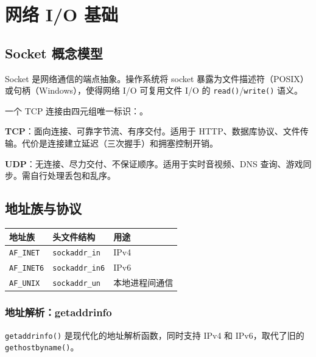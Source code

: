 \documentclass[12pt,a4paper,fontset=fandol]{ctexbook}
\newcommand{\Fn}[1]{\texttt{#1()}}
\newcommand{\Tp}[1]{\texttt{#1}}
\begin{document}
\chapter{网络 I/O 基础}

\section{Socket 概念模型}

Socket 是网络通信的端点抽象。操作系统将 socket 暴露为文件描述符（POSIX）或句柄（Windows），使得网络 I/O 可复用文件 I/O 的 \Fn{read}/\allowbreak{}\Fn{write} 语义。

一个 TCP 连接由四元组唯一标识：\texttt{}。

\begin{guideline}[title=TCP vs UDP 选型]
\textbf{TCP}：面向连接、可靠字节流、有序交付。适用于 HTTP、数据库协议、文件传输。代价是连接建立延迟（三次握手）和拥塞控制开销。

\textbf{UDP}：无连接、尽力交付、不保证顺序。适用于实时音视频、DNS 查询、游戏同步。需自行处理丢包和乱序。
\end{guideline}

\section{地址族与协议}

\begin{tabular}{lll}
\toprule
\textbf{地址族} & \textbf{头文件结构} & \textbf{用途} \\
\midrule
\Tp{AF\_INET}  & \Tp{sockaddr\_in}  & IPv4 \\
\Tp{AF\_INET6} & \Tp{sockaddr\_in6} & IPv6 \\
\Tp{AF\_UNIX}  & \Tp{sockaddr\_un}  & 本地进程间通信 \\
\bottomrule
\end{tabular}

\subsection{地址解析：getaddrinfo}

\Tp{getaddrinfo()} 是现代化的地址解析函数，同时支持 IPv4 和 IPv6，取代了旧的 \Fn{gethostbyname}。
\end{document}
